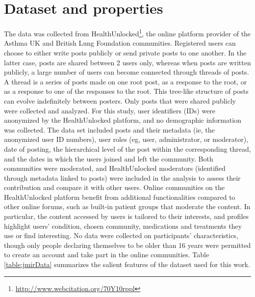 \section{Dataset and properties}
\label{sec:dataset}
The data was collected from HealthUnlocked\footnote{\url{http://www.webcitation.org/70Y10rppl}}, the online platform provider of the Asthma UK and British Lung Foundation communities. Registered users can choose to either write posts publicly or send private posts to one another. In the latter case, posts are shared between 2 users only, whereas when posts are written publicly, a large number of users can become connected through threads of posts. A thread is a series of posts made on one root post, as a response to the root, or as a response to one of the responses to the root. This tree-like structure of posts can evolve indefinitely between posters. 
Only posts that were shared publicly were collected and analyzed. For this study, user identifiers (IDs) were anonymized by the HealthUnlocked platform, and no demographic information was collected. 
The data set included posts and their metadata (ie, the anonymized user ID numbers), user roles (eg, user, administrator, or moderator), date of posting, the hierarchical level of the post within the corresponding thread, and the dates in which the users joined and left the community. Both communities were moderated, and HealthUnlocked moderators (identified through metadata linked to posts) were included in the analysis to assess their contribution and compare it with other users. Online communities on the HealthUnlocked platform benefit from additional functionalities compared to other online forums, such as built-in patient groups that moderate the content. In particular, the content accessed by users is tailored to their interests, and profiles highlight users’ condition, chosen community, medications and treatments they use or find interesting. No data were collected on participants’ characteristics, though only people declaring themselves to be older than 16 years were permitted to create an account and take part in the online communities. Table \ref{table:jmirData} summarizes the salient features of the dataset used for this work. 


